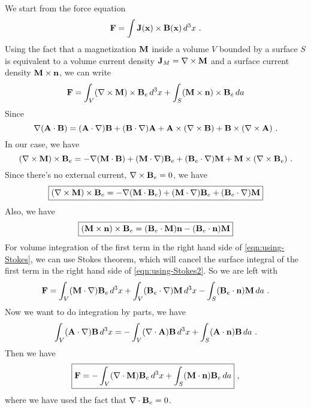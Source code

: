 \documentclass[12pt]{article}
\newcommand{\x}{{\bf x}}
\newcommand{\B}{{\bf B}}
\newcommand{\bJ}{{\bf J}}
\newcommand{\A}{{\bf A}}
\begin{document}
\newpage
{} We start from the force equation
\begin{equation}
    {\bf F} = \int \bJ(\x) \times \B(\x)\, d^3x~.
\end{equation}
Using the fact that a magnetization $\bf M$ inside a volume $V$ bounded by a surface $S$ is equivalent to a volume current density $\bJ_M = \nabla \times {\bf M}$ and a surface current density ${\bf M} \times {\bf n}$, we can write
\begin{align}
    {\bf F} = \int_V (\nabla \times {\bf M})\times \B_e \,d^3 x + \int_S ({\bf M} \times {\bf n}) \times \B_e \,d a
\end{align}
Since
\begin{equation}
    \nabla(\A \cdot \B) = (\A \cdot \nabla) \B + (\B \cdot \nabla) \A + \A \times (\nabla \times \B) + \B \times (\nabla \times \A)~.
\end{equation}
In our case, we have
\begin{equation}
    (\nabla \times {\bf M}) \times \B_e = - \nabla({\bf M} \cdot \B) + ({\bf M} \cdot \nabla) \B_e + (\B_e \cdot \nabla) {\bf M} + {\bf M} \times (\nabla \times \B_e)~.
\end{equation}
Since there's no external current, $\nabla \times \B_e = 0$, we have
\begin{equation}\label{eqn:using-Stokes}
    \boxed{(\nabla \times {\bf M}) \times \B_e = - \nabla({\bf M} \cdot \B_e) + ({\bf M} \cdot \nabla) \B_e + (\B_e \cdot \nabla) {\bf M}}
\end{equation}
Also, we have
\begin{equation}\label{eqn:using-Stokes2}
    \boxed{
    ({\bf M} \times {\bf n}) \times \B_e = (\B_e \cdot {\bf M}) {\bf n} - (\B_e \cdot {\bf n}) {\bf M}}
\end{equation}
For volume integration of the first term in the right hand side of \eqref{eqn:using-Stokes}, we can use Stokes theorem, which will cancel the surface integral of the first term in the right hand side of \eqref{eqn:using-Stokes2}. So we are left with
\begin{equation}
    {\bf F} = \int_V ({\bf M} \cdot \nabla) \B_e\, d^3 x+ \int_V (\B_e \cdot \nabla){\bf M} \, d^3 x - \int_S (\B_e \cdot {\bf n}) {\bf M} \, da~.
\end{equation}
Now we want to do integration by parts, we have
\begin{equation}
    \int_V(\A \cdot \nabla) \B\, d^3x = - \int_V(\nabla \cdot \A) \B\, d^3x + \int_S ( \A\cdot{\bf n} )\B \, da~.
\end{equation}
Then we have
\begin{equation}
    \boxed{
    {\bf F} = - \int_V (\nabla \cdot {\bf M}) \B_e \,d^3x + \int_S({\bf M} \cdot{\bf n} ) \B_e \, da
    }~,
\end{equation}
where we have used the fact that $\nabla \cdot \B_e = 0$.
\end{document}
